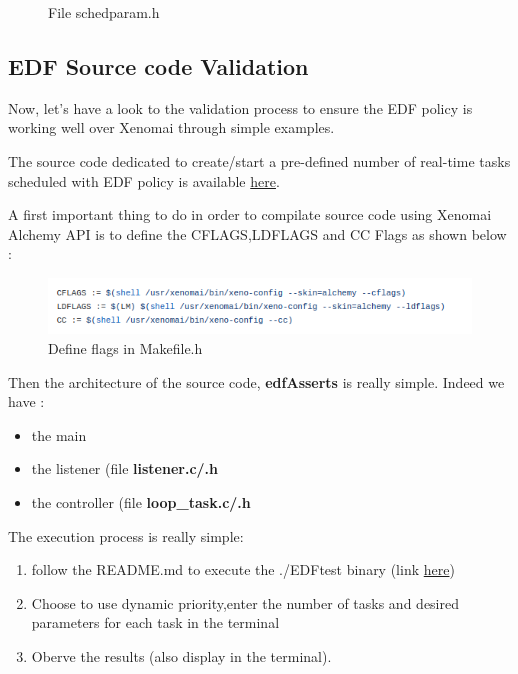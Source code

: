 \documentclass[12pt,hidelinks]{article}
\begin{document}
{\begin{figure}
\begin{minipage}{0.45\textwidth}
            \caption{File schedparam.h}
        \end{minipage}
    \end{figure}
    


    \newpage
    \subsection{EDF Source code Validation}
    
    Now, let's have a look to the validation process to ensure the EDF policy is working well over Xenomai through simple examples.
    
    The source code dedicated to create/start a pre-defined number of real-time tasks scheduled with EDF policy is available \href{https://github.com/skyultime/M2_ERTS_Project_xenomai_edh/tree/main/Tests/EDFonXenomai/edfAsserts}{here}.
    
    A first important thing to do in order to compilate source code using Xenomai Alchemy API is to define the CFLAGS,LDFLAGS and CC Flags as shown below :
    
    \begin{figure}[ht]
        \centering
        \includegraphics[scale=1]{flagsDefMakefile.png}
        \caption{Define flags in Makefile.h}
	\end{figure} \newline
    
    Then the architecture of the source code, \textbf{edfAsserts} is really simple.\newline
    Indeed we have :
    \begin{itemize}
        \item the main
        \item the listener (file \textbf{listener.c/.h}
        \item the controller (file \textbf{loop_task.c/.h}
    \end{itemize}
    
    The execution process is really simple:
    \begin{enumerate}
        \item follow the README.md to execute the ./EDFtest binary (link \href{https://github.com/skyultime/M2_ERTS_Project_xenomai_edh/tree/main/Tests/EDFonXenomai/edfAsserts}{here})
        \item Choose to use dynamic priority,enter the number of tasks and desired parameters for each task in the terminal
        \item Oberve the results (also display in the terminal).
    

\end{enumerate}}
\end{document}
